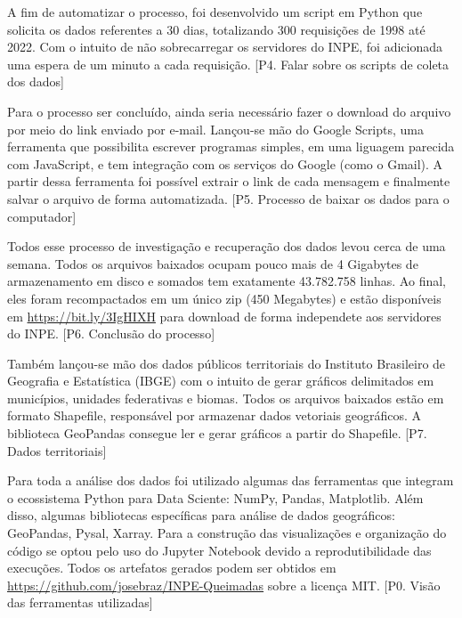 \documentclass[cic,tc]{iiufrgs}
\begin{document}
A fim de automatizar o processo, foi desenvolvido um script em Python que 
solicita os dados referentes a 30 dias, totalizando 300 requisições de 1998 
até 2022. Com 
o intuito de não sobrecarregar os servidores do INPE, foi adicionada uma espera de 
um minuto a cada requisição. [P4. Falar sobre os scripts de coleta dos dados] \par

Para o processo ser concluído, ainda seria 
necessário fazer o download do arquivo por meio do link enviado por e-mail.
Lançou-se mão do Google Scripts, uma ferramenta que possibilita escrever 
programas simples, em uma liguagem parecida com JavaScript, e tem 
integração com os serviços do Google (como o Gmail). A partir dessa ferramenta
foi possível extrair o link de cada mensagem e finalmente salvar o arquivo
de forma automatizada. [P5. Processo de baixar os dados para o computador] \par

Todos esse processo de investigação e recuperação dos dados levou cerca de uma 
semana. Todos os arquivos baixados ocupam pouco mais de 4 Gigabytes de 
armazenamento em disco e somados tem exatamente 43.782.758 linhas. Ao final, eles 
foram recompactados em um único zip (450 Megabytes) e estão disponíveis 
em \url{https://bit.ly/3IgHIXH} para download de forma independete aos servidores 
do INPE. [P6. Conclusão do processo] \par

Também lançou-se mão dos dados públicos territoriais do Instituto Brasileiro de 
Geografia e Estatística (IBGE) com o intuito de gerar gráficos delimitados em 
municípios, unidades federativas e biomas. Todos os arquivos baixados estão em 
formato Shapefile, responsável por armazenar dados vetoriais geográficos. A 
biblioteca GeoPandas consegue ler e gerar gráficos a partir do Shapefile.
[P7. Dados territoriais] \par


Para toda a análise dos dados foi utilizado algumas das ferramentas que integram o 
ecossistema Python para Data Sciente: NumPy, Pandas, Matplotlib. Além disso, 
algumas bibliotecas específicas para análise de dados geográficos: GeoPandas, 
Pysal, Xarray. Para a construção das visualizações e organização do código se 
optou pelo uso do Jupyter Notebook devido a reprodutibilidade das execuções. 
Todos os artefatos gerados podem ser obtidos em 
\url{https://github.com/josebraz/INPE-Queimadas} sobre a licença MIT. 
[P0. Visão das ferramentas utilizadas]\par
\end{document}
